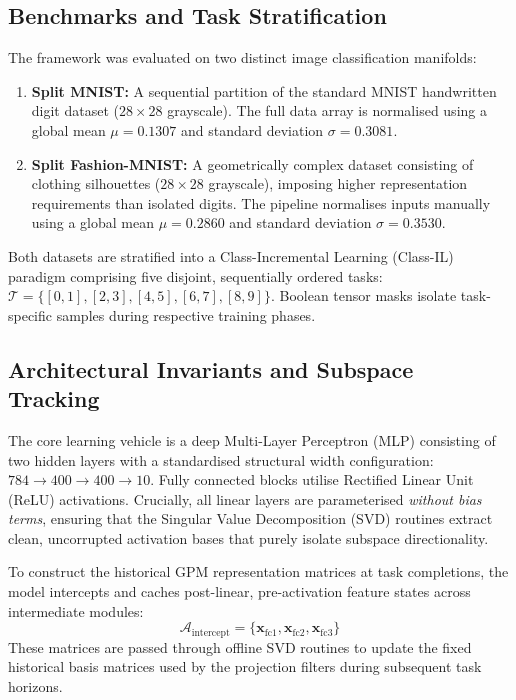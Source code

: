 \documentclass[10pt,a4paper]{article}
\begin{document}
		\subsection{Benchmarks and Task Stratification}
		
		The framework was evaluated on two distinct image classification manifolds:
		\begin{enumerate}
			\item \textbf{Split MNIST:} A sequential partition of the standard MNIST handwritten digit dataset ($28 \times 28$ grayscale). The full data array is normalised using a global mean $\mu = 0.1307$ and standard deviation $\sigma = 0.3081$.
			\item \textbf{Split Fashion-MNIST:} A geometrically complex dataset consisting of clothing silhouettes ($28 \times 28$ grayscale), imposing higher representation requirements than isolated digits. The pipeline normalises inputs manually using a global mean $\mu = 0.2860$ and standard deviation $\sigma = 0.3530$.
		\end{enumerate}
		
		Both datasets are stratified into a Class-Incremental Learning (Class-IL) paradigm comprising five disjoint, sequentially ordered tasks: $\mathcal{T} = \{[0, 1], [2, 3], [4, 5], [6, 7], [8, 9]\}$. Boolean tensor masks isolate task-specific samples during respective training phases.
		
		\subsection{Architectural Invariants and Subspace Tracking}
		
		The core learning vehicle is a deep Multi-Layer Perceptron (MLP) consisting of two hidden layers with a standardised structural width configuration: $784 \to 400 \to 400 \to 10$. Fully connected blocks utilise Rectified Linear Unit (ReLU) activations. Crucially, all linear layers are parameterised \textit{without bias terms}, ensuring that the Singular Value Decomposition (SVD) routines extract clean, uncorrupted activation bases that purely isolate subspace directionality.
		
		To construct the historical GPM representation matrices at task completions, the model intercepts and caches post-linear, pre-activation feature states across intermediate modules:
		\begin{equation}
			\mathcal{A}_{\text{intercept}} = \{\mathbf{x}_{\text{fc1}}, \mathbf{x}_{\text{fc2}}, \mathbf{x}_{\text{fc3}}\}
		\end{equation}
		These matrices are passed through offline SVD routines to update the fixed historical basis matrices used by the projection filters during subsequent task horizons.
		
\end{document}
